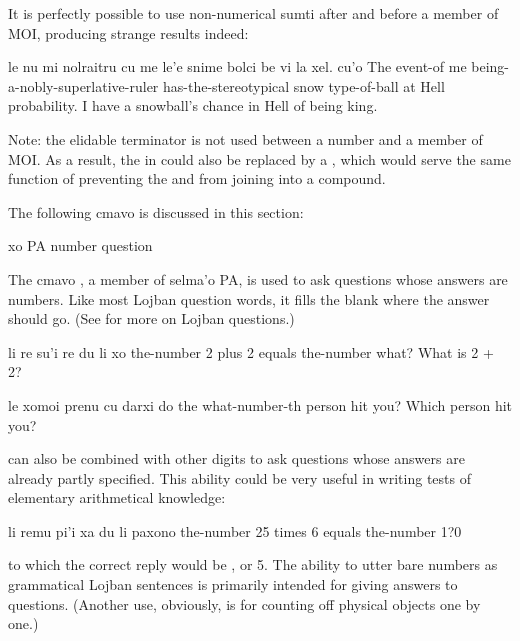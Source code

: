It is perfectly possible to use non-numerical sumti after
     and before a member of MOI, producing strange results
    indeed:
\begin{example}
le nu mi nolraitru\n
\T	cu me le'e snime bolci\n
\T	be vi la xel. cu'o\n
The event-of me being-a-nobly-superlative-ruler\n
\T	has-the-stereotypical snow type-of-ball\n
\T	at Hell probability.\n
I have a snowball's chance in Hell of being king.
\end{example}

Note: the elidable terminator  is not used between a
    number and a member of MOI. As a result, the  in  could also be replaced by a
    , which would serve the same function of preventing the
     and  from joining into a compound.



The following cmavo is discussed in this section:

   xo  PA  number question

The cmavo , a member of selma'o PA, is used to ask
    questions whose answers are numbers. Like most Lojban question
    words, it fills the blank where the answer should go. (See  for more on Lojban
    questions.)
\begin{example}
li re su'i re du li xo\n
the-number 2 plus 2 equals the-number what?\n
What is 2 + 2?
\end{example}

\begin{example}
le xomoi prenu cu darxi do\n
the what-number-th person hit you?\n
Which person  hit you?
\end{example}

 can also be combined with other digits to ask questions
    whose answers are already partly specified. This ability could
    be very useful in writing tests of elementary arithmetical
    knowledge:
\begin{example}
li remu pi'i xa du li paxono\n
the-number 25 times 6 equals the-number 1?0
\end{example}

{\noindent}to which the correct reply would be , or 5. The ability
    to utter bare numbers as grammatical Lojban sentences is
    primarily intended for giving answers to  questions.
    (Another use, obviously, is for counting off physical objects
    one by one.)



